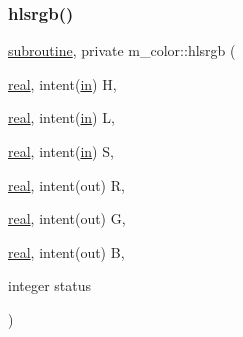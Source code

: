 \subsubsection{\texorpdfstring{hlsrgb()}{hlsrgb()}}
{\footnotesize\ttfamily \hyperlink{M__stopwatch_83_8txt_acfbcff50169d691ff02d4a123ed70482}{subroutine}, private m\+\_\+color\+::hlsrgb (\begin{DoxyParamCaption}\item[{\hyperlink{read__watch_83_8txt_abdb62bde002f38ef75f810d3a905a823}{real}, intent(\hyperlink{M__journal_83_8txt_afce72651d1eed785a2132bee863b2f38}{in})}]{H,  }\item[{\hyperlink{read__watch_83_8txt_abdb62bde002f38ef75f810d3a905a823}{real}, intent(\hyperlink{M__journal_83_8txt_afce72651d1eed785a2132bee863b2f38}{in})}]{L,  }\item[{\hyperlink{read__watch_83_8txt_abdb62bde002f38ef75f810d3a905a823}{real}, intent(\hyperlink{M__journal_83_8txt_afce72651d1eed785a2132bee863b2f38}{in})}]{S,  }\item[{\hyperlink{read__watch_83_8txt_abdb62bde002f38ef75f810d3a905a823}{real}, intent(out)}]{R,  }\item[{\hyperlink{read__watch_83_8txt_abdb62bde002f38ef75f810d3a905a823}{real}, intent(out)}]{G,  }\item[{\hyperlink{read__watch_83_8txt_abdb62bde002f38ef75f810d3a905a823}{real}, intent(out)}]{B,  }\item[{integer}]{status }\end{DoxyParamCaption})\hspace{0.3cm}{\ttfamily [private]}}


